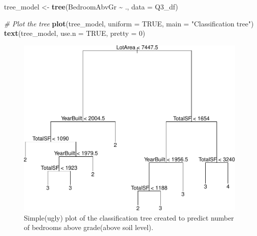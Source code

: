 \documentclass[
]{article}
\newenvironment{Shaded}{\begin{snugshade}}{\end{snugshade}}
\newcommand{\AttributeTok}[1]{\textcolor[rgb]{0.13,0.29,0.53}{#1}}
\newcommand{\CommentTok}[1]{\textcolor[rgb]{0.56,0.35,0.01}{\textit{#1}}}
\newcommand{\ConstantTok}[1]{\textcolor[rgb]{0.56,0.35,0.01}{#1}}
\newcommand{\DecValTok}[1]{\textcolor[rgb]{0.00,0.00,0.81}{#1}}
\newcommand{\FunctionTok}[1]{\textcolor[rgb]{0.13,0.29,0.53}{\textbf{#1}}}
\newcommand{\NormalTok}[1]{#1}
\newcommand{\OtherTok}[1]{\textcolor[rgb]{0.56,0.35,0.01}{#1}}
\newcommand{\SpecialCharTok}[1]{\textcolor[rgb]{0.81,0.36,0.00}{\textbf{#1}}}
\newcommand{\StringTok}[1]{\textcolor[rgb]{0.31,0.60,0.02}{#1}}
\begin{document}
\newpage

\begin{Shaded}
\begin{Highlighting}[]
\NormalTok{tree\_model }\OtherTok{\textless{}{-}} \FunctionTok{tree}\NormalTok{(BedroomAbvGr }\SpecialCharTok{\textasciitilde{}}\NormalTok{ ., }\AttributeTok{data =}\NormalTok{ Q3\_df)}

\CommentTok{\# Plot the tree}
\FunctionTok{plot}\NormalTok{(tree\_model, }\AttributeTok{uniform =} \ConstantTok{TRUE}\NormalTok{, }\AttributeTok{main =} \StringTok{"Classification tree"}\NormalTok{)}
\FunctionTok{text}\NormalTok{(tree\_model, }\AttributeTok{use.n =} \ConstantTok{TRUE}\NormalTok{, }\AttributeTok{pretty =} \DecValTok{0}\NormalTok{)}
\end{Highlighting}
\end{Shaded}

\begin{figure}
\centering
\includegraphics{STAT847_W24_Final_files/figure-latex/unnamed-chunk-9-1.pdf}
\caption{Simple(ugly) plot of the classification tree created to predict
number of bedrooms above grade(above soil level).}
\end{figure}

\newpage
\end{document}

